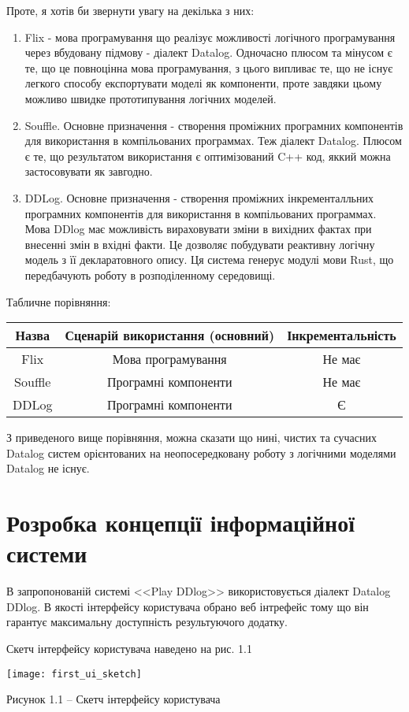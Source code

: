 Проте, я хотів би звернути увагу на декілька з них:

\begin{enumerate}

\item Flix -  мова програмування що реалізує можливості логічного програмування через вбудовану підмову - діалект Datalog. Одночасно плюсом та мінусом є те, що це повноцінна мова програмування, з цього випливає те, що не існує легкого способу експортувати моделі як компоненти, проте завдяки цьому можливо швидке прототипування логічних моделей.

\item Souffle. Основне призначення - створення проміжних програмних компонентів для використання в компільованих программах. Теж діалект Datalog. Плюсом є те, що результатом використання є оптимізований C++ код, яккий можна застосовувати як завгодно.

\item DDLog. Основне призначення - створення проміжних інкременталльних програмних компонентів для використання в компільованих программах. Мова DDlog має можливість вираховувати зміни в вихідних фактах при внесенні змін в вхідні факти. Це дозволяє побудувати реактивну логічну модель з її декларатовного опису. Ця система генерує модулі мови Rust, що передбачують роботу в розподіленному середовищі.

\end{enumerate}

Табличне порівняння: 

{\small
\begin{center}
\begin{tabular}{ | c | c | c |  }
\hline
 Назва & Сценарій використання (основний)  & Інкрементальність \\ 
\hline
 Flix & Мова програмування & Не має \\  
\hline
 Souffle & Програмні компоненти & Не має \\  
\hline
 DDLog & Програмні компоненти & Є \\  
\hline
\end{tabular}
\end{center}
}

З приведеного вище порівняння, можна сказати що нині, чистих та сучасних Datalog систем орієнтованих на неопосередковану роботу з логічними моделями Datalog не існує.

\newpage

\section{Розробка концепції інформаційної системи}

В запропонованій системі <<Play DDlog>> використовується діалект Datalog DDlog.  В якості інтерфейсу користувача обрано веб інтрефейс тому що він гарантує максимальну доступність результуючого додатку.

Скетч інтерфейсу користувача наведено на рис. 1.1

\begin{center}
\texttt{[image: first\_ui\_sketch]}

Рисунок 1.1 -- Скетч інтерфейсу користувача

\end{center}